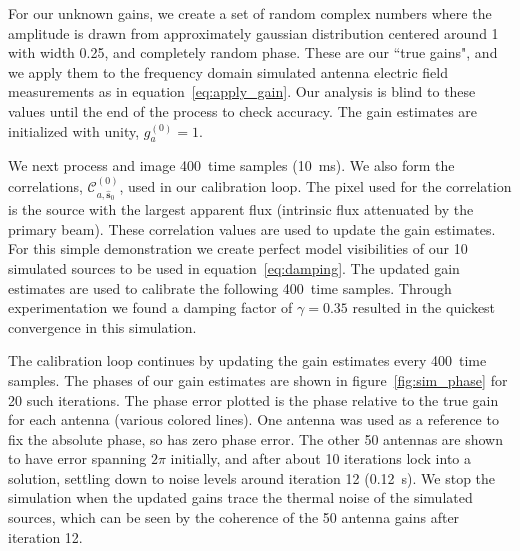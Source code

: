 \documentclass[a4paper,fleqn,usenatbib]{mnras}
\newcommand{\spix}{\ensuremath{\hat{\mathbf{s}}_{0}}}
\newcommand{\Cna}[1][n]{\ensuremath{\mathcal{C}^{(#1)}_{a,\spix}}}
\newcommand{\caliter}{400}
\newcommand{\damp}{\ensuremath{\gamma}}
\begin{document}
For our unknown gains, we create a set of random complex numbers where the amplitude is 
drawn from approximately gaussian distribution centered around 1 with width 0.25, and 
completely random phase. These are our ``true gains", and we apply them to the frequency
domain simulated antenna electric field measurements as in equation~\ref{eq:apply_gain}. Our analysis is 
blind to these values until the end of the process to check accuracy. The gain estimates are 
initialized with unity, $g^{(0)}_a=1$.

We next process and image \caliter~time samples (10~ms). We also form the correlations, 
\Cna[0], used in our calibration loop. The pixel used for the correlation is the source with the 
largest apparent flux (intrinsic flux attenuated by the primary beam). These correlation values 
are used to update the gain estimates. For this simple demonstration we create perfect model 
visibilities of our 10 simulated sources to be used in equation~\ref{eq:damping}. 
The updated gain estimates are used to calibrate the following 
\caliter~time samples. Through experimentation we found a damping factor of $\damp=0.35$ 
resulted in the quickest convergence in this simulation.

The calibration loop continues by updating the gain estimates every \caliter~time samples. The 
phases of our gain estimates are shown in figure~\ref{fig:sim_phase} for 20 such iterations. 
The phase error plotted is the phase relative to the true gain for each antenna (various colored 
lines). One antenna was used as a reference to fix the absolute phase, so has zero phase 
error. The other 50 antennas are shown to have error spanning $2\pi$ initially, and after about 
10 iterations lock into a solution, settling down to noise levels around iteration 12 (0.12~s). We 
stop the simulation when the updated gains trace the thermal noise of the simulated sources, 
which can be seen by the coherence of the 50 antenna gains after iteration 12.
\end{document}
